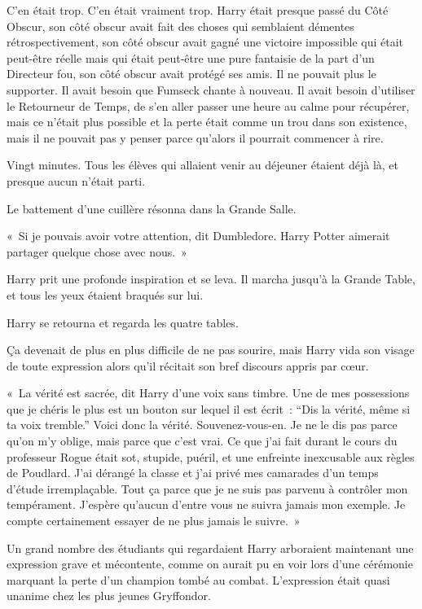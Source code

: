 C'en était trop. C'en était vraiment trop. Harry était presque passé du Côté Obscur, son côté obscur avait fait des choses qui semblaient démentes rétrospectivement, son côté obscur avait gagné une victoire impossible qui était peut-être réelle mais qui était peut-être une pure fantaisie de la part d'un Directeur fou, son côté obscur avait protégé ses amis. Il ne pouvait plus le supporter. Il avait besoin que Fumseck chante à nouveau. Il avait besoin d'utiliser le Retourneur de Temps, de s'en aller passer une heure au calme pour récupérer, mais ce n'était plus possible et la perte était comme un trou dans son existence, mais il ne pouvait pas y penser parce qu'alors il pourrait commencer à rire.

Vingt minutes. Tous les élèves qui allaient venir au déjeuner étaient déjà là, et presque aucun n'était parti.

Le battement d'une cuillère résonna dans la Grande Salle.

«~Si je pouvais avoir votre attention, dit Dumbledore. Harry Potter aimerait partager quelque chose avec nous.~»

Harry prit une profonde inspiration et se leva. Il marcha jusqu'à la Grande Table, et tous les yeux étaient braqués sur lui.

Harry se retourna et regarda les quatre tables.

Ça devenait de plus en plus difficile de ne pas sourire, mais Harry vida son visage de toute expression alors qu'il récitait son bref discours appris par cœur.

«~La vérité est sacrée, dit Harry d'une voix sans timbre. Une de mes possessions que je chéris le plus est un bouton sur lequel il est écrit~: “Dis la vérité, même si ta voix tremble.” Voici donc la vérité. Souvenez-vous-en. Je ne le dis pas parce qu'on m'y oblige, mais parce que c'est vrai. Ce que j'ai fait durant le cours du professeur Rogue était sot, stupide, puéril, et une enfreinte inexcusable aux règles de Poudlard. J'ai dérangé la classe et j'ai privé mes camarades d'un temps d'étude irremplaçable. Tout ça parce que je ne suis pas parvenu à contrôler mon tempérament. J'espère qu'aucun d'entre vous ne suivra jamais mon exemple. Je compte certainement essayer de ne plus jamais le suivre.~»

Un grand nombre des étudiants qui regardaient Harry arboraient maintenant une expression grave et mécontente, comme on aurait pu en voir lors d'une cérémonie marquant la perte d'un champion tombé au combat. L'expression était quasi unanime chez les plus jeunes Gryffondor.

